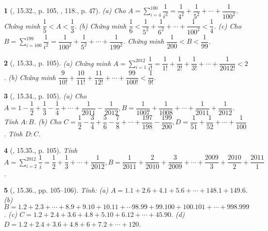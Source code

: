 \documentclass{article}
\newtheorem{baitoan}{}
\begin{document}
\begin{baitoan}[\cite{TLCT_THCS_Toan_6_so_hoc}, 15.32., p. 105, \cite{Binh_Toan_6_tap_2}, 118., p. 47]
	(a) Cho $A = \sum_{i=4}^{100} \dfrac{1}{i^2} = \dfrac{1}{4^2} + \dfrac{1}{5^2} + \cdots + \dfrac{1}{100^2}$. Chứng minh $\dfrac{1}{5} < A < \dfrac{1}{3}$. (b) Chứng minh $\dfrac{1}{6} < \dfrac{1}{5^2} + \dfrac{1}{6^2} + \cdots + \dfrac{1}{100^2} < \dfrac{1}{4}$. (c) Cho $B = \sum_{i=100}^{199} \dfrac{1}{i^2} = \dfrac{1}{100^2} + \dfrac{1}{5^2} + \cdots + \dfrac{1}{199^2}$. Chứng minh $\dfrac{1}{200} < B < \dfrac{1}{99}$.
\end{baitoan}

\begin{baitoan}[\cite{TLCT_THCS_Toan_6_so_hoc}, 15.33., p. 105]
	(a) Chứng minh $A = \sum_{i=1}^{2012} \dfrac{1}{i!} = \dfrac{1}{1!} + \dfrac{1}{2!} + \dfrac{1}{3!} + \cdots + \dfrac{1}{2012!} < 2$. (b) Chứng minh $\dfrac{9}{10!} + \dfrac{10}{11!} + \dfrac{11}{12!} + \cdots + \dfrac{99}{100!} < \dfrac{1}{9!}$.
\end{baitoan}

\begin{baitoan}[\cite{TLCT_THCS_Toan_6_so_hoc}, 15.34., p. 105]
	(a) Cho $A = 1 - \dfrac{1}{2} + \dfrac{1}{3} - \dfrac{1}{4} + \cdots + \dfrac{1}{2011} - \dfrac{1}{2012},B = \dfrac{1}{1007} + \dfrac{1}{1008} + \cdots + \dfrac{1}{2011} + \dfrac{1}{2012}$. Tính $A:B$. (b) Cho $C = \dfrac{1}{2} - \dfrac{3}{4} + \dfrac{5}{6} - \dfrac{7}{8} + \cdots + \dfrac{197}{198} - \dfrac{199}{200},D = \dfrac{1}{51} + \dfrac{1}{52} + \cdots + \dfrac{1}{100}$. Tính $D:C$.
\end{baitoan}

\begin{baitoan}[\cite{TLCT_THCS_Toan_6_so_hoc}, 15.35., p. 105]
	Tính $A = \sum_{i=2}^{2012} \dfrac{1}{i} = \dfrac{1}{2} + \dfrac{1}{3} + \cdots + \dfrac{1}{2012},B = \dfrac{1}{2011} + \dfrac{2}{2010} + \dfrac{3}{2009} + \cdots + \dfrac{2009}{3} + \dfrac{2010}{2} + \dfrac{2011}{1}$.
\end{baitoan}

\begin{baitoan}[\cite{TLCT_THCS_Toan_6_so_hoc}, 15.36., pp. 105--106]
	Tính: (a) $A = 1.1 + 2.6 + 4.1 + 5.6 + \cdots + 148.1 + 149.6$. (b) $B = 1.2 + 2.3 + \cdots + 8.9 + 9.10 + 10.11 + \cdots 98.99 + 99.100 + 100.101 + \cdots + 998.999$. (c) $C = 1.2 + 2.4 + 3.6 + 4.8 + 5.10 + 6.12 + \cdots + 45.90$. (d) $D = 1.2 + 2.4 + 3.6 + 4.8 + 6 + 7.2 + \cdots + 120$.
\end{baitoan}
\end{document}
